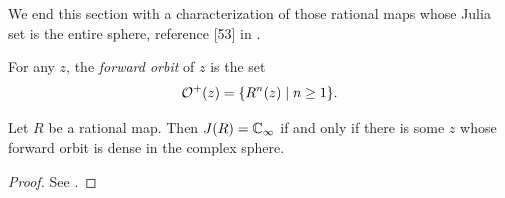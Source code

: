 We end this section with a characterization of those rational maps whose Julia
set is the entire sphere, reference [53] in \cite{Beardon1991}.

\begin{definition}
    For any $z$, the \emph{forward orbit} of $z$ is the set
    \begin{equation*}
        \mathcal{O}^+(z) = \{R^n(z) \mid n \geq 1\}.
    \end{equation*}
\end{definition}

\begin{theorem}[$J = \ExtC \iff \exists z$ with dense forward orbit in $\ExtC$]
    \label{thm:J_equals_ExtC_iff_exists_z_with_dense_forward_orbit}
    Let $R$ be a rational map. Then $J(R) = \mathbb{C}_\infty$ if and only if there is some
    $z$ whose forward orbit is dense in the complex sphere.
\end{theorem}
\begin{proof}
    See \cite[76--77]{Beardon1991}.
\end{proof}